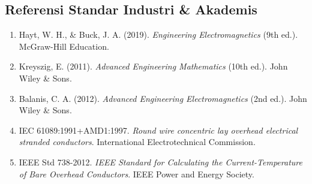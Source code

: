 \documentclass[11pt,a4paper]{article}
\theoremstyle{definition}
\begin{document}
\subsection{Referensi Standar Industri \& Akademis}
\begin{enumerate}[leftmargin=*]
    \item Hayt, W. H., \& Buck, J. A. (2019). \textit{Engineering Electromagnetics} (9th ed.). McGraw-Hill Education.
    \item Kreyszig, E. (2011). \textit{Advanced Engineering Mathematics} (10th ed.). John Wiley \& Sons.
    \item Balanis, C. A. (2012). \textit{Advanced Engineering Electromagnetics} (2nd ed.). John Wiley \& Sons.
    \item IEC 61089:1991+AMD1:1997. \textit{Round wire concentric lay overhead electrical stranded conductors}. International Electrotechnical Commission.
    \item IEEE Std 738-2012. \textit{IEEE Standard for Calculating the Current-Temperature of Bare Overhead Conductors}. IEEE Power and Energy Society.
\end{enumerate}
\end{document}

